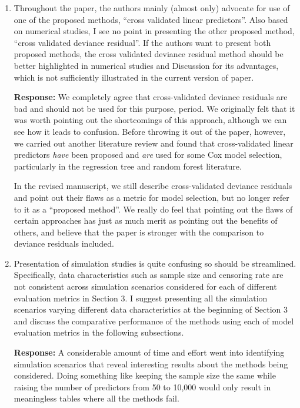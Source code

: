 \documentclass[12]{article}
\newcommand{\re}{\textbf{Response: }}
\begin{document}
\begin{enumerate}[align = left]
\item Throughout the paper, the authors mainly (almost only) advocate for use of one of the proposed methods, “cross validated linear predictors”. Also based on numerical studies, I see no point in presenting the other proposed method, “cross validated deviance residual”. If the authors want to present both proposed methods, the cross validated deviance residual method should be better highlighted in numerical studies and Discussion for its advantages, which is not sufficiently illustrated in the current version of paper.

  \re We completely agree that cross-validated deviance residuals are bad and should not be used for this purpose, period. We originally felt that it was worth pointing out the shortcomings of this approach, although we can see how it leads to confusion. Before throwing it out of the paper, however, we carried out another literature review and found that cross-validated linear predictors \emph{have} been proposed and \emph{are} used for some Cox model selection, particularly in the regression tree and random forest literature.

  In the revised manuscript, we still describe cross-validated deviance residuals and point out their flaws as a metric for model selection, but no longer refer to it as a ``proposed method''. We really do feel that pointing out the flaws of certain approaches has just as much merit as pointing out the benefits of others, and believe that the paper is stronger with the comparison to deviance residuals included.

\item Presentation of simulation studies is quite confusing so should be streamlined. Specifically, data characteristics such as sample size and censoring rate are not consistent across simulation scenarios considered for each of different evaluation metrics in Section 3. I suggest presenting all the simulation scenarios varying different data characteristics at the beginning of Section 3 and discuss the comparative performance of the methods using each of model evaluation metrics in the following subsections.

  \re A considerable amount of time and effort went into identifying simulation scenarios that reveal interesting results about the methods being considered. Doing something like keeping the sample size the same while raising the number of predictors from 50 to 10,000 would only result in meaningless tables where all the methods fail.


\end{enumerate}
\end{document}
